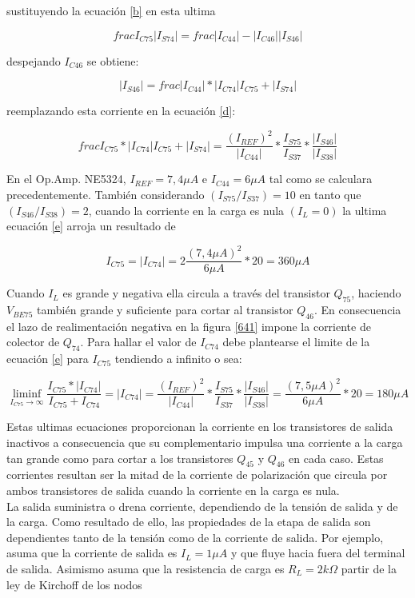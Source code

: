 \documentclass[12pt,a4paper,final,headinclude,footinclude,BCOR5mm]{scrartcl}
\begin{document}
sustituyendo la ecuación \ref{b} en esta ultima

$$frac{I_{C75}}{|I_{S74}|} = frac{|I_{C44}|-|I_{C46}|}{|I_{S46}|}$$

despejando $I_{C46}$ se obtiene:

$$|I_{S46}| = frac{|I_{C44}|*|I_{C74}|}{I_{C75}+|I_{S74}|}$$

reemplazando esta corriente en la ecuación \ref{d}:

\begin{equation}
frac{I_{C75}*|I_{C74}|}{I_{C75}+|I_{S74}|} = \frac{(I_{REF})^{2}}{|I_{C44}|} * \frac{I_{S75}}{I_{S37}} * \frac{|I_{S46}|}{|I_{S38}|}
\label{e}
\end{equation}

En el Op.Amp. NE5324, $I_{REF} = 7,4 \mu A$ e $I_{C44} = 6 \mu A$ tal como se calculara precedentemente. También considerando $(I_{S75}/I_{S37}) = 10$ en tanto que $(I_{S46}/I_{S38}) = 2$, cuando la corriente en la carga es nula $(I_{L} = 0)$ la ultima ecuación \ref{e} arroja un resultado de

$$I_{C75} = |I_{C74}| = 2 \frac{(7,4 \mu A)^{2}}{6 \mu A} * 20 = 360 \mu A$$

Cuando $I_{L}$ es grande y negativa ella circula a través del transistor $Q_{75}$, haciendo $V_{BE75}$ también grande y suficiente para cortar al transistor $Q_{46}$. En consecuencia el lazo de realimentación negativa en la figura \ref{641} impone la corriente de colector de $Q_{74}$. Para hallar el valor de $I_{C74}$ debe plantearse el limite de la ecuación \ref{e} para $I_{C75}$ tendiendo a infinito o sea:

$$ \liminf_{I_{C75} \rightarrow \infty} \frac{I_{C75} * |I_{C74}|}{I_{C75} + I_{C74}} = |I_{C74}| = \frac{(I_{REF})^{2}}{|I_{C44}|} * \frac{I_{S75}}{I_{S37}} * \frac{|I_{S46}|}{|I_{S38}|} = \frac{(7,5 \mu A)^{2}}{6 \mu A} * 20 = 180 \mu A$$

Estas ultimas ecuaciones proporcionan la corriente en los transistores de salida inactivos a consecuencia que su complementario impulsa una corriente a la carga tan grande como para cortar a los transistores $Q_{45}$ y $Q_{46}$ en cada caso. Estas corrientes resultan ser la mitad de la corriente de polarización que circula por ambos transistores de salida cuando la corriente en la carga es nula.\\

La salida suministra o drena corriente, dependiendo de la tensión de salida y de la carga. Como resultado de ello, las propiedades de la etapa de salida son dependientes tanto de la tensión como de la corriente de salida. Por ejemplo, asuma que la corriente de salida es $I_{L} = 1 \mu A$ y que fluye hacia fuera del terminal de salida. Asimismo asuma que la resistencia de carga es $R_{L} = 2 k\Omega$ partir  de la ley de Kirchoff de los nodos
\end{document}

